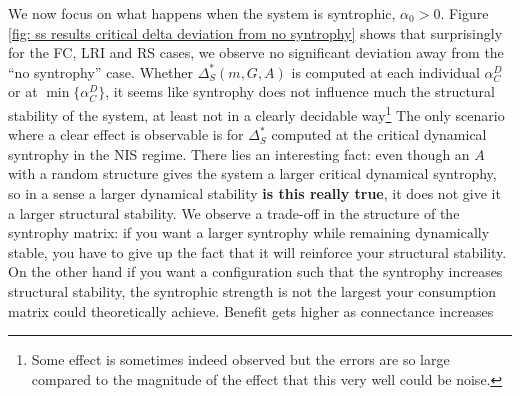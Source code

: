 \documentclass[12pt, titlepage]{report}
\begin{document}
We now focus on what happens when the system is syntrophic, \ie $\alpha_0 > 0$. Figure \ref{fig: ss results critical delta deviation from no syntrophy} shows that surprisingly for the FC, LRI and RS cases, we observe no significant deviation away from the ``no syntrophy'' case. Whether $\Delta_S^*(m, G, A)$ is computed at each individual $\alpha_C^D$ or at $\min\{\alpha_C^D\}$, it seems like syntrophy does not influence much the structural stability of the system, at least not in a clearly decidable way\footnote{Some effect is sometimes indeed observed but the errors are so large compared to the magnitude of the effect that this very well could be noise.} The only scenario where a clear effect is observable is for $\Delta_S^*$ computed at the critical dynamical syntrophy in the NIS regime. There lies an interesting fact: even though an $A$ with a random structure gives the system a larger critical dynamical syntrophy, so in a sense a larger dynamical stability \textbf{is this really true}, it does not give it a larger structural stability. We observe a trade-off in the structure of the syntrophy matrix: if you want a larger syntrophy while remaining dynamically stable, you have to give up the fact that it will reinforce your structural stability. On the other hand if you want a configuration such that the syntrophy increases structural stability, the syntrophic strength is not the largest your consumption matrix could theoretically achieve.
Benefit gets higher as connectance increases
\end{document}
